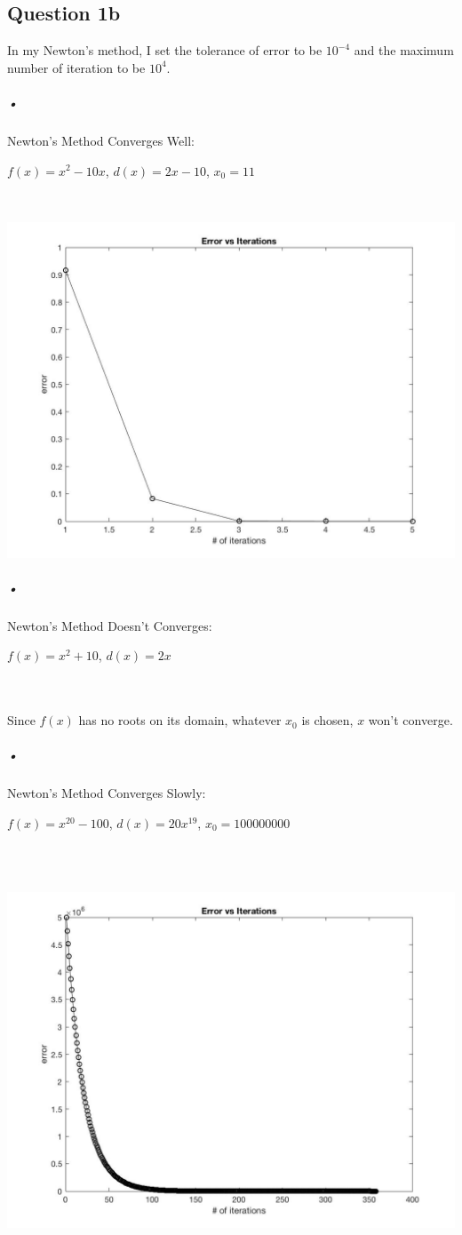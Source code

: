 \documentclass[11pt]{article} %
\begin{document}
\subsection{Question 1b}
In my Newton's method, I set the tolerance of error to be $10^{-4}$ and the maximum number of iteration to be $10^{4}$.
\subparagraph{•}
Newton's Method Converges Well: \\
\centerline{$f(x) = x^{2}-10x$, $d(x) = 2x-10$, $x_{0} = 11$}\\
\begin{center}
\includegraphics[scale = 0.35]{q121.jpg}
\end{center}
\subparagraph{•}
Newton's Method Doesn't Converges:\\\linebreak
\centerline{$f(x) = x^{2}+10$, $d(x) = 2x$}\\\\
Since $f(x)$ has no roots on its domain, whatever $x_{0}$ is chosen, $x$ won't converge.
\subparagraph{•}
Newton's Method Converges Slowly: \\\linebreak
\centerline{$f(x) = x^{20} - 100$, $d(x) = 20x^{19}$, $x_{0} = 100000000$}\\\\
\begin{center}
\includegraphics[scale = 0.35]{q123.jpg}
\end{center}
\end{document}

